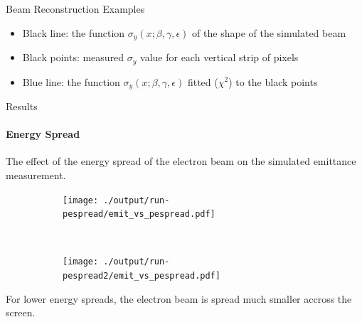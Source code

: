 \documentclass[aspectratio=169]{beamer}
\begin{document}
\begin{frame}{Beam Reconstruction Examples}
	\begin{itemize}
		\item Black line: the function \(\sigma_y \left(x; \beta,\gamma,\epsilon \right)\) of the shape of the simulated beam
		\item Black points: measured \(\sigma_y\) value for each vertical strip of pixels
		\item Blue line: the function \(\sigma_y \left(x; \beta,\gamma,\epsilon \right)\)
			fitted (\(\chi^2\)) to the black points
	\end{itemize}

\end{frame}

\begin{frame}[t]{Results}
	\framesubtitle{Energy Spread}
	The effect of the energy spread of the electron beam on the simulated
	emittance measurement.

	\begin{figure}
		\vspace*{-1em}
		\begin{subfigure}[t]{0.45\textwidth}
			\centering
			\texttt{[image: ./output/run-pespread/emit\_vs\_pespread.pdf]}
		\end{subfigure}%
		~
		\begin{subfigure}[t]{0.55\textwidth}
			\centering
			\texttt{[image: ./output/run-pespread2/emit\_vs\_pespread.pdf]}
		\end{subfigure}
	\end{figure}

	For lower energy spreads, the electron beam is spread much smaller
	accross the screen.
\end{frame}
\end{document}

